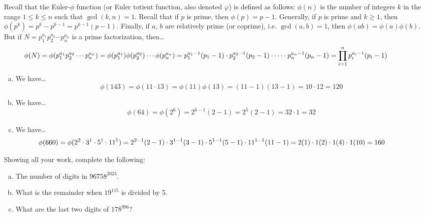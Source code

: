 \documentclass[11pt,letterpaper]{article}
\begin{document}
\sol Recall that the Euler-$\phi$ function (or Euler totient function, also denoted $\varphi$) is defined as follows: $\phi(n)$ is the number of integers $k$ in the range $1 \leq k \leq n$ such that $\gcd(k, n)= 1$. Recall that if $p$ is prime, then $\phi(p)= p - 1$. Generally, if $p$ is prime and $k \geq 1$, then $\phi(p^k)= p^k - p^{k-1}= p^{k-1} (p - 1)$. Finally, if $a$, $b$ are relatively prime (or coprime), i.e. $\gcd(a, b)= 1$, then $\phi(ab)= \phi(a) \phi(b)$. But if $N= p_1^{a_1} p_2^{a_2} \cdots p_n^{a_n}$ is a prime factorization, then\dots
	\[
	\hspace{-1cm} \phi(N)= \phi(p_1^{a_1} p_2^{a_2} \cdots p_n^{a_n})= \phi(p_1^{a_1}) \phi(p_2^{a_2}) \cdots \phi(p_n^{a_n})= p_1^{a_1 - 1} (p_1 - 1) \cdot p_2^{a_2 - 1} (p_2 - 1) \cdot \cdots \cdot p_n^{a_n - 1} (p_n - 1)= \prod_{i=1}^n p_i^{a_i - 1} (p_i - 1)
	\]

\begin{enumerate}[(a)]
\item We have\dots
	\[
	\phi(143)= \phi(11 \cdot 13)= \phi(11) \phi(13)= (11 - 1)(13 - 1)= 10 \cdot 12= 120 
	\] \pspace

\item We have\dots
	\[
	\phi(64)= \phi(2^6)= 2^{6 - 1} (2 - 1)= 2^5 (2 - 1)= 32 \cdot 1= 32
	\] \pspace

\item We have\dots
	\[
	\hspace{-1cm} \phi(660)= \phi(2^2 \cdot 3^1 \cdot 5^1 \cdot 11^1)= 2^{2 - 1} (2 - 1) \cdot 3^{1 - 1} (3 - 1) \cdot 5^{1 - 1} (5 - 1) \cdot 11^{1 - 1} (11 - 1)= 2(1) \cdot 1(2) \cdot 1(4) \cdot 1(10)= 160 
	\]
\end{enumerate}



\newpage



 Showing all your work, complete the following:
	\begin{enumerate}[(a)]
	\item The number of digits in $96758^{2023}$.
	\item What is the remainder when $19^{115}$ is divided by 5.
	\item What are the last two digits of $178^{996}$?
	\end{enumerate} \pspace
\end{document}
